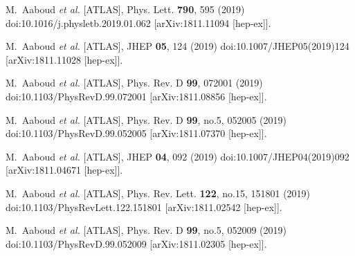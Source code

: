 \begin{thebibliography}{9}
M.~Aaboud \textit{et al.} [ATLAS],
Phys. Lett. \textbf{790}, 595 (2019)
doi:10.1016/j.physletb.2019.01.062
[arXiv:1811.11094 [hep-ex]].

M.~Aaboud \textit{et al.} [ATLAS],
JHEP \textbf{05}, 124 (2019)
doi:10.1007/JHEP05(2019)124
[arXiv:1811.11028 [hep-ex]].

M.~Aaboud \textit{et al.} [ATLAS],
Phys. Rev. D \textbf{99}, 072001 (2019)
doi:10.1103/PhysRevD.99.072001
[arXiv:1811.08856 [hep-ex]].

M.~Aaboud \textit{et al.} [ATLAS],
Phys. Rev. D \textbf{99}, no.5, 052005 (2019)
doi:10.1103/PhysRevD.99.052005
[arXiv:1811.07370 [hep-ex]].

M.~Aaboud \textit{et al.} [ATLAS],
JHEP \textbf{04}, 092 (2019)
doi:10.1007/JHEP04(2019)092
[arXiv:1811.04671 [hep-ex]].

M.~Aaboud \textit{et al.} [ATLAS],
Phys. Rev. Lett. \textbf{122}, no.15, 151801 (2019)
doi:10.1103/PhysRevLett.122.151801
[arXiv:1811.02542 [hep-ex]].

M.~Aaboud \textit{et al.} [ATLAS],
Phys. Rev. D \textbf{99}, no.5, 052009 (2019)
doi:10.1103/PhysRevD.99.052009
[arXiv:1811.02305 [hep-ex]].


\end{thebibliography}
